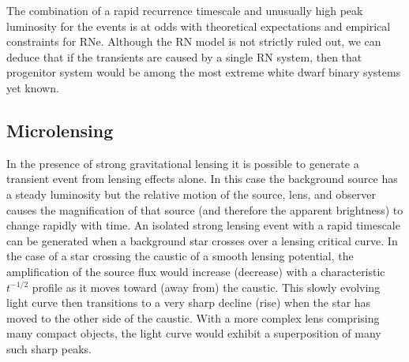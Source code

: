 The combination of a rapid recurrence timescale and unusually high
peak luminosity for the \spock events is at odds with theoretical
expectations and empirical constraints for RNe. Although the RN model
is not strictly ruled out, we can deduce that if the \spock transients
are caused by a single RN system, then that progenitor system would be
among the most extreme white dwarf binary systems yet known.




\subsection{Microlensing}\label{sec:MicroLensing}

In the presence of strong gravitational lensing it is possible to
generate a transient event from lensing effects alone.  In this case
the background source has a steady luminosity but the relative motion
of the source, lens, and observer causes the magnification of that
source (and therefore the apparent brightness) to change rapidly with
time.  An isolated strong lensing event with a rapid timescale can be
generated when a background star crosses over a lensing critical
curve.  In the case of a star crossing the caustic of a smooth lensing
potential, the amplification of the source flux would increase
(decrease) with a characteristic $t^{-1/2}$ profile as it moves toward
(away from) the caustic. This slowly evolving light curve then
transitions to a very sharp decline (rise) when the star has moved to
the other side of the caustic\cite{Schneider:1986,
  MiraldaEscude:1991}.  With a more complex lens comprising many
compact objects, the light curve would exhibit a superposition of many
such sharp peaks\cite{Lewis:1993}.

